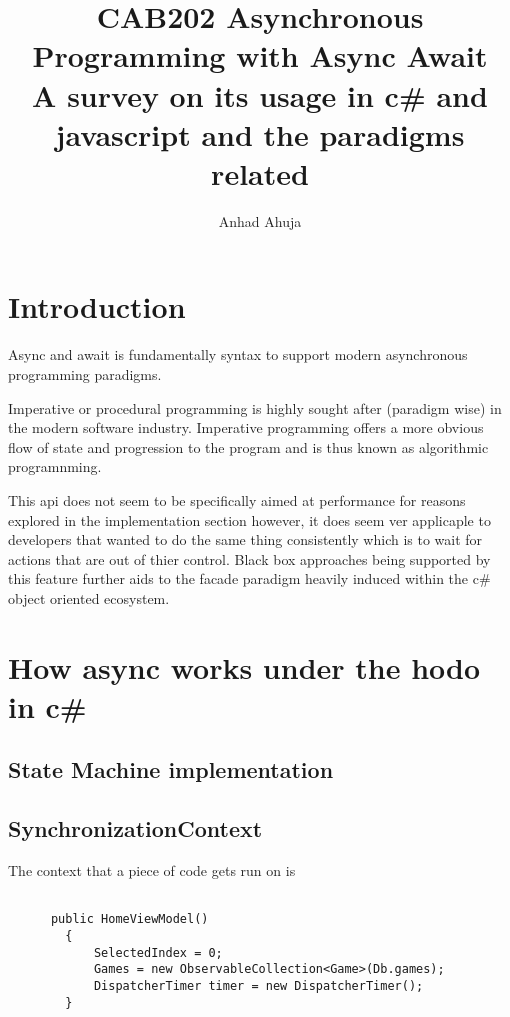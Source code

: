\documentclass{article}
\title{CAB202 Asynchronous Programming with Async Await
\\\large A survey on its usage in c\# and javascript and the paradigms related}
\author{Anhad Ahuja}
\begin{document}
\maketitle



\section{Introduction}
Async and await is fundamentally syntax to support modern asynchronous programming paradigms.

Imperative or procedural programming is highly sought after (paradigm wise) in the modern software industry. 
Imperative programming offers a more obvious flow of state and progression to the program and is thus known as algorithmic programnming.

This api does not seem to be specifically aimed at performance for reasons explored in the implementation section
however, it does seem ver applicaple to developers that wanted to do the same thing consistently which is to wait for actions that are out of thier control. 
Black box approaches being supported by this feature further aids to the facade paradigm heavily induced within the c\# object oriented ecosystem. 





\newpage

\section{How async works under the hodo in c\#}
\subsection{State Machine implementation}

\subsection{SynchronizationContext}
The context that a piece of code gets run on is

\begin{lstlisting}[language={[Sharp]C}]

      public HomeViewModel()
        {
            SelectedIndex = 0;
            Games = new ObservableCollection<Game>(Db.games);
            DispatcherTimer timer = new DispatcherTimer();
        }
\end{lstlisting}
\end{document}
